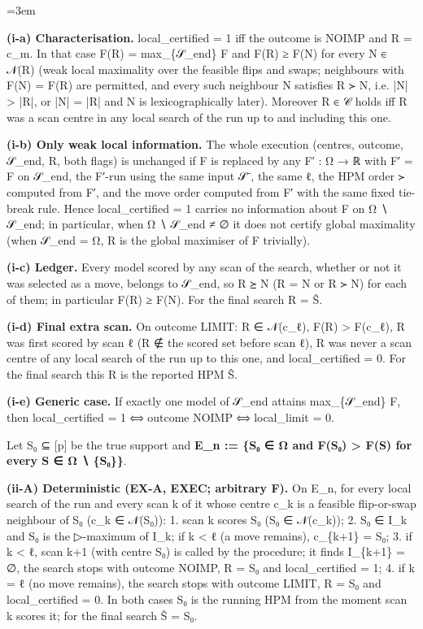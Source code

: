\documentclass[11pt]{report}
\newenvironment{mdblock}{\begingroup\mdfont\raggedright\setlength{\parindent}{0pt}\setlength{\parskip}{0.55em}\emergencystretch=3em}{\par\endgroup}
\newcommand{\mdhead}[2]{\par\vspace{0.7em}\noindent{\bfseries\ifcase#1\or\large\or\normalsize\or\normalsize\or\small\or\small\or\small\fi #2}\par\nopagebreak\vspace{0.1em}}
\begin{document}
\begin{mdblock}
\begin{mdbul}
\item \textbf{(i-a) Characterisation.} {\mdtt local\_\allowbreak{}certified} = 1 iff the outcome is NOIMP and R = c\_m. In that case F(R) = max\_\{𝒮\_end\} F and F(R) ≥ F(N) for every N ∈ 𝒩(R) (weak local maximality over the feasible flips and swaps; neighbours with F(N) = F(R) are permitted, and every such neighbour N satisfies R ≻ N, i.e. |N| > |R|, or |N| = |R| and N is lexicographically later). Moreover R ∈ 𝒞 holds iff R was a scan centre in any local search of the run up to and including this one.
\item \textbf{(i-b) Only weak local information.} The whole execution (centres, outcome, 𝒮\_end, R, both flags) is unchanged if F is replaced by any F′ : Ω → ℝ with F′ = F on 𝒮\_end, the F′-run using the same input 𝒮⁻, the same ℓ, the HPM order ≻ computed from F′, and the move order computed from F′ with the same fixed tie-break rule. Hence {\mdtt local\_\allowbreak{}certified} = 1 carries no information about F on Ω ∖ 𝒮\_end; in particular, when Ω ∖ 𝒮\_end ≠ ∅ it does not certify global maximality (when 𝒮\_end = Ω, R is the global maximiser of F trivially).
\item \textbf{(i-c) Ledger.} Every model scored by any scan of the search, whether or not it was selected as a move, belongs to 𝒮\_end, so R ⪰ N (R = N or R ≻ N) for each of them; in particular F(R) ≥ F(N). For the final search R = Ŝ.
\item \textbf{(i-d) Final extra scan.} On outcome LIMIT: R ∈ 𝒩(c\_ℓ), F(R) > F(c\_ℓ), R was first scored by scan ℓ (R ∉ the scored set before scan ℓ), R was never a scan centre of any local search of the run up to this one, and {\mdtt local\_\allowbreak{}certified} = 0. For the final search this R is the reported HPM Ŝ.
\item \textbf{(i-e) Generic case.} If exactly one model of 𝒮\_end attains max\_\{𝒮\_end\} F, then {\mdtt local\_\allowbreak{}certified} = 1 ⟺ outcome NOIMP ⟺ {\mdtt local\_\allowbreak{}limit} = 0.
\end{mdbul}

\mdhead{2}{4. Clause (ii): one neighbour of S₀}

Let S₀ ⊆ [p] be the true support and \textbf{E\_n := \{S₀ ∈ Ω and F(S₀) > F(S) for every S ∈ Ω ∖ \{S₀\}\}}.

\textbf{(ii-A) Deterministic (EX-A, EXEC; arbitrary F).} On E\_n, for every local search of the run and every scan k of it whose centre c\_k is a feasible flip-or-swap neighbour of S₀ (c\_k ∈ 𝒩(S₀)): 1. scan k scores S₀ (S₀ ∈ 𝒩(c\_k)); 2. S₀ ∈ I\_k and S₀ is the ▷-maximum of I\_k; if k < ℓ (a move remains), c\_\{k+1\} = S₀; 3. if k < ℓ, scan k+1 (with centre S₀) is called by the procedure; it finds I\_\{k+1\} = ∅, the search stops with outcome NOIMP, R = S₀ and {\mdtt local\_\allowbreak{}certified} = 1; 4. if k = ℓ (no move remains), the search stops with outcome LIMIT, R = S₀ and {\mdtt local\_\allowbreak{}certified} = 0. In both cases S₀ is the running HPM from the moment scan k scores it; for the final search Ŝ = S₀.


\end{mdblock}
\end{document}
